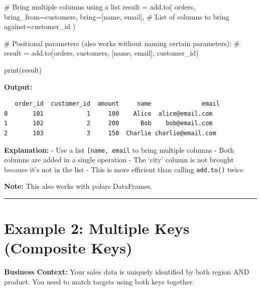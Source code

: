 \documentclass[
  letterpaper,
]{scrbook}
\newenvironment{Shaded}{\begin{snugshade}}{\end{snugshade}}
\newcommand{\BuiltInTok}[1]{\textcolor[rgb]{0.00,0.23,0.31}{#1}}
\newcommand{\CommentTok}[1]{\textcolor[rgb]{0.37,0.37,0.37}{#1}}
\newcommand{\NormalTok}[1]{\textcolor[rgb]{0.00,0.23,0.31}{#1}}
\newcommand{\OperatorTok}[1]{\textcolor[rgb]{0.37,0.37,0.37}{#1}}
\newcommand{\StringTok}[1]{\textcolor[rgb]{0.13,0.47,0.30}{#1}}
\begin{document}
\begin{Shaded}
\begin{Highlighting}[]
\CommentTok{\# Bring multiple columns using a list}
\NormalTok{result }\OperatorTok{=}\NormalTok{ add.to(}
\NormalTok{    orders,}
\NormalTok{    bring\_from}\OperatorTok{=}\NormalTok{customers,}
\NormalTok{    bring}\OperatorTok{=}\NormalTok{[}\StringTok{\textquotesingle{}name\textquotesingle{}}\NormalTok{, }\StringTok{\textquotesingle{}email\textquotesingle{}}\NormalTok{],      }\CommentTok{\# List of columns to bring}
\NormalTok{    against}\OperatorTok{=}\StringTok{\textquotesingle{}customer\_id\textquotesingle{}}
\NormalTok{)}

\CommentTok{\# Positional parameters (also works without naming certain parameters):}
\CommentTok{\# result = add.to(orders, customers, [\textquotesingle{}name\textquotesingle{}, \textquotesingle{}email\textquotesingle{}], \textquotesingle{}customer\_id\textquotesingle{})}

\BuiltInTok{print}\NormalTok{(result)}
\end{Highlighting}
\end{Shaded}

\textbf{Output:}

\begin{verbatim}
   order_id  customer_id  amount     name              email
0       101            1     100    Alice  alice@email.com
1       102            2     200      Bob    bob@email.com
2       103            3     150  Charlie charlie@email.com
\end{verbatim}

\textbf{Explanation:} - Use a list
\texttt{{[}\textquotesingle{}name\textquotesingle{},\ \textquotesingle{}email\textquotesingle{}{]}}
to bring multiple columns - Both columns are added in a single operation
- The `city' column is not brought because it's not in the list - This
is more efficient than calling \texttt{add.to()} twice

\textbf{Note:} This also works with polars DataFrames.

\begin{center}\rule{0.5\linewidth}{0.5pt}\end{center}

\section{Example 2: Multiple Keys (Composite
Keys)}\label{example-2-multiple-keys-composite-keys}

\textbf{Business Context:} Your sales data is uniquely identified by
both region AND product. You need to match targets using both keys
together.
\end{document}
